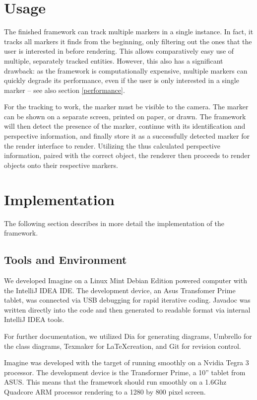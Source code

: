 \section{Usage}

The finished framework can track multiple markers in a single instance.
In fact, it tracks all markers it finds from the beginning, only filtering out the ones that the user is interested in before rendering.
This allows comparatively easy use of multiple, separately tracked entities.
However, this also has a significant drawback: as the framework is computationally expensive, multiple markers can quickly degrade its performance, even if the user is only interested in a single marker – see also section \ref{performance}.

For the tracking to work, the marker must be visible to the camera.
The marker can be shown on a separate screen, printed on paper, or drawn.
The framework will then detect the presence of the marker, continue with its identification and perspective information, and finally store it as a successfully detected marker for the render interface to render.
Utilizing the thus calculated perspective information, paired with the correct object, the renderer then proceeds to render objects onto their respective markers.

\section{Implementation}

The following section describes in more detail the implementation of the framework.

\subsection{Tools and Environment}

We developed Imagine on a Linux Mint Debian Edition powered computer with the IntelliJ IDEA IDE\cite{idea}.
The development device, an Asus Transfomer Prime tablet, was connected via USB debugging for rapid iterative coding.
Javadoc was written directly into the code and then generated to readable format via internal IntelliJ IDEA tools.

For further documentation, we utilized Dia\cite{dia} for generating diagrams, Umbrello\cite{umbrello} for the class diagrams, Texmaker\cite{texmaker} for \LaTeX creation, and Git\cite{git} for revision control.

Imagine was developed with the target of running smoothly on a Nvidia Tegra 3 processor.
The development device is the Transformer Prime, a 10'' tablet from ASUS\cite{devicedev}.
This means that the framework should run smoothly on a 1.6Ghz Quadcore ARM processor rendering to a 1280 by 800 pixel screen.

